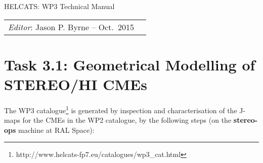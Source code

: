 \documentclass[12pt, a4paper, oneside]{article}
\begin{document}








\begin{center}
{\sc \Large HELCATS: WP3 Technical Manual}
\end{center}

 
\begin{center}
\begin{tabular}{ll}
\textit{Editor}: Jason P. Byrne -- Oct.~2015
\end{tabular}
\end{center}
 

\section*{\sc Task 3.1: Geometrical Modelling of STEREO/HI CMEs}

The WP3 catalogue\footnote{http://www.helcats-fp7.eu/catalogues/wp3\_cat.html} is generated by inspection and characterisation of the J-maps for the CMEs in the WP2 catalogue, by the following steps (on the {\bf stereo-ops} machine at RAL Space):
\end{document}
